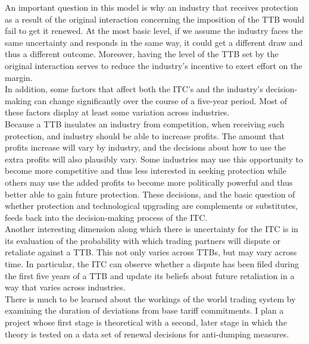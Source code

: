 \documentclass[12pt]{article}
\begin{document}
An important question in this model is why an industry that receives protection as a result of the original interaction concerning the imposition of the TTB would fail to get it renewed. At the most basic level, if we assume the industry faces the same uncertainty and responds in the same way, it could get a different draw and thus a different outcome. Moreover, having the level of the TTB set by the original interaction serves to reduce the industry's incentive to exert effort on the margin. \\

In addition, some factors that affect both the ITC's and the industry's decision-making can change significantly over the course of a five-year period. Most of these factors display at least some variation across industries. \\

Because a TTB insulates an industry from competition, when receiving such protection, and industry should be able to increase profits. The amount that profits increase will vary by industry, and the decisions about how to use the extra profits will also plausibly vary. Some industries may use this opportunity to become more competitive and thus less interested in seeking protection while others may use the added profits to become more politically powerful and thus better able to gain future protection. These decisions, and the basic question of whether protection and technological upgrading are complements or substitutes, feeds back into the decision-making process of the ITC. \\

Another interesting dimension along which there is uncertainty for the ITC is in its evaluation of the probability with which trading partners will dispute or retaliate against a TTB. This not only varies across TTBs, but may vary across time. In particular, the ITC can observe whether a dispute has been filed during the first five years of a TTB and update its beliefs about future retaliation in a way that varies across industries. \\

There is much to be learned about the workings of the world trading system by examining the duration of deviations from base tariff commitments. I plan a project whose first stage is theoretical with a second, later stage in which the theory is tested on a data set of renewal decisions for anti-dumping measures.
		
\end{document}
